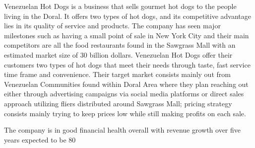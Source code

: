 
Venezuelan Hot Dogs is a business that sells gourmet hot dogs to the people living in the Doral. It offers two types of hot dogs, and its competitive advantage lies in its quality of service and products. The company has seen major milestones such as having a small point of sale in New York City and their main competitors are all the food restaurants found in the Sawgrass Mall with an estimated market size of 30 billion dollars. Venezuelan Hot Dogs offer their customers two types of hot dogs that meet their needs through taste, fast service time frame and convenience. Their target market consists mainly out from Venezuelan Communities found within Doral Area where they plan reaching out either through advertising campaigns via social media platforms or direct sales approach utilizing fliers distributed around Sawgrass Mall; pricing strategy consists mainly trying to keep prices low while still making profits on each sale.

The company is in good financial health overall with revenue growth over five years expected to be 80%